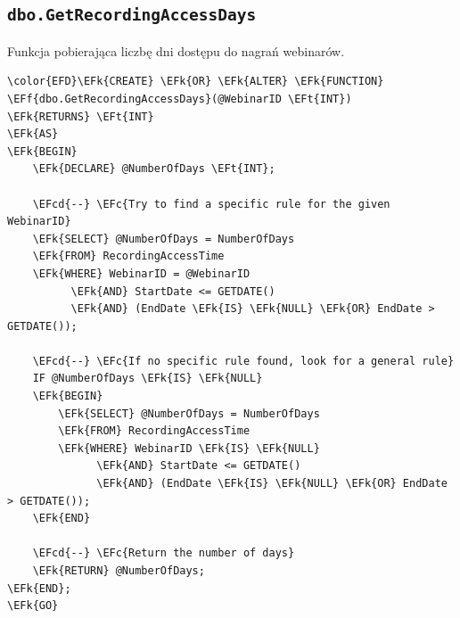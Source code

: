 \documentclass[11pt]{article}
\newcommand{\EFc}[1]{\textcolor{EFc}{\textit{#1}}} %
\newcommand{\EFcd}[1]{\textcolor{EFcd}{\textit{#1}}} %
\newcommand{\EFk}[1]{\textcolor{EFk}{\textbf{#1}}} %
\newcommand{\EFf}[1]{\textcolor{EFf}{#1}} %
\newcommand{\EFt}[1]{\textcolor{EFt}{\textbf{#1}}} %
\begin{document}
\subsection{\texttt{dbo.GetRecordingAccessDays}}
\label{sec:orge2bff40}
Funkcja pobierająca liczbę dni dostępu do nagrań webinarów.
\begin{Code}
\begin{Verbatim}
\color{EFD}\EFk{CREATE} \EFk{OR} \EFk{ALTER} \EFk{FUNCTION} \EFf{dbo.GetRecordingAccessDays}(@WebinarID \EFt{INT})
\EFk{RETURNS} \EFt{INT}
\EFk{AS}
\EFk{BEGIN}
    \EFk{DECLARE} @NumberOfDays \EFt{INT};

    \EFcd{--} \EFc{Try to find a specific rule for the given WebinarID}
    \EFk{SELECT} @NumberOfDays = NumberOfDays
    \EFk{FROM} RecordingAccessTime
    \EFk{WHERE} WebinarID = @WebinarID
          \EFk{AND} StartDate <= GETDATE() 
          \EFk{AND} (EndDate \EFk{IS} \EFk{NULL} \EFk{OR} EndDate > GETDATE());

    \EFcd{--} \EFc{If no specific rule found, look for a general rule}
    IF @NumberOfDays \EFk{IS} \EFk{NULL}
    \EFk{BEGIN}
        \EFk{SELECT} @NumberOfDays = NumberOfDays
        \EFk{FROM} RecordingAccessTime
        \EFk{WHERE} WebinarID \EFk{IS} \EFk{NULL}
              \EFk{AND} StartDate <= GETDATE() 
              \EFk{AND} (EndDate \EFk{IS} \EFk{NULL} \EFk{OR} EndDate > GETDATE());
    \EFk{END}

    \EFcd{--} \EFc{Return the number of days}
    \EFk{RETURN} @NumberOfDays;
\EFk{END};
\EFk{GO}
\end{Verbatim}
\end{Code}
\end{document}
